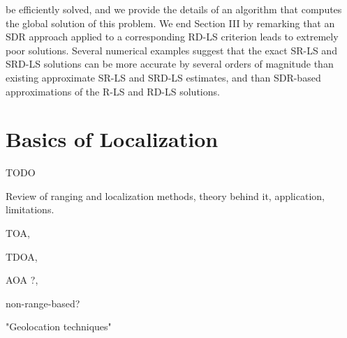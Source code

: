 be efficiently solved, and we provide the details of an algorithm that computes the global solution of this problem. We end Section III by remarking that an SDR approach applied to a corresponding RD-LS criterion leads to extremely poor solutions. Several numerical examples suggest that the exact SR-LS and SRD-LS solutions can be more accurate by several orders of magnitude than existing approximate SR-LS and SRD-LS estimates, and than SDR-based approximations of the R-LS and
RD-LS solutions.

\section{Basics of Localization}

TODO

Review of ranging and localization methods, theory behind it, application, limitations. 

TOA,
 
TDOA,

AOA ?,

non-range-based? 

"Geolocation techniques"

